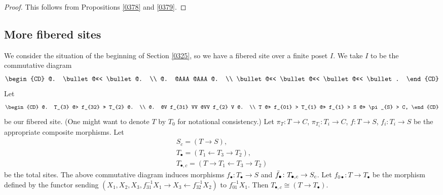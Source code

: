\documentclass{amsart}
\theoremstyle{remark}
\numberwithin{equation}{subsection}
\begin{document}
\begin{proof}
	This follows from Propositions \ref{0378} and \ref{0379}.
\end{proof}


\subsection{More fibered sites}
\label{0322}

We consider the situation of the beginning of Section \ref{0325},
so we have a fibered site over a finite poset $I$.
We take $I$ to be the commutative diagram
	\[
		\begin{CD}
			@.
				\bullet
			@<<<
				\bullet
			@.
			\\ @. @AAA @AAA @. \\
				\bullet
			@<<<
				\bullet
			@<<<
				\bullet
			@<<<
				\bullet.
		\end{CD}
	\]
Let
	\begin{equation} \label{0394}
		\begin{CD}
			@.
				T_{3}
			@> f_{32} >>
				T_{2}
			@.
			\\ @. @V f_{31} VV @VV f_{2} V @. \\
				T
			@>> f_{01} >
				T_{1}
			@>> f_{1} >
				S
			@>> \pi_{S} >
				C,
		\end{CD}
	\end{equation}
be our fibered site.
(One might want to denote $T$ by $T_{0}$ for notational consistency.)
Let $\pi_{T} \colon T \to C$, $\pi_{T_{i}} \colon T_{i} \to C$,
$f \colon T \to S$, $f_{i} \colon T_{i} \to S$ be the appropriate composite morphisms.
Let
	\begin{gather*}
			S_{c} = (T \to S),
		\\
			T_{\bullet} = (T_{1} \gets T_{3} \to T_{2}),
		\\
			T_{\bullet, c} = (T \to T_{1} \gets T_{3} \to T_{2})
	\end{gather*}
be the total sites.
The above commutative diagram induces morphisms
$f_{\bullet} \colon T_{\bullet} \to S$ and $\Bar{f}_{\bullet} \colon T_{\bullet, c} \to S_{c}$.
Let $f_{0 \bullet} \colon T \to T_{\bullet}$ be the morphism defined by the functor sending
$(X_{1}, X_{2}, X_{3}, f_{31}^{-1} X_{1} \to X_{3} \gets f_{32}^{-1} X_{2})$
to $f_{01}^{-1} X_{1}$.
Then $T_{\bullet, c} \cong (T \to T_{\bullet})$.
\end{document}
